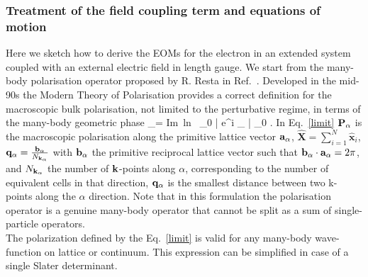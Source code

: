 \subsubsection{Treatment of the field coupling term and equations of motion}\label{ss:fldcpl}
Here we sketch how to derive the EOMs for the electron in an extended system coupled with an external electric field in length gauge. We start from the many-body polarisation operator proposed by R. Resta in Ref.~.
Developed in the mid-90s the Modern Theory of Polarisation\cite{RevModPhys.66.899} provides a correct definition for the macroscopic bulk polarisation, not limited to the perturbative regime, in terms of the many-body geometric phase 
\be 
\PP_\alpha =   \mbox{Im ln }  \langle \Psi_0 | {\rm e}^{i \qq_\alpha \cdot {}} | \Psi_0 \rangle . \label{limit} 
\ee
In Eq.~\eqref{limit} ${\bf P}_\alpha$ is the macroscopic polarisation along the primitive lattice vector ${\bf a}_\alpha$, $\hat{\mathbf X} = \sum_{i=1}^{N} \hat{\mathbf x}_i$, ${\bf q}_\alpha = \frac{{\bf b}_\alpha}{N_{{\bf k}_\alpha}}$ with ${\bf b}_\alpha$ the primitive reciprocal lattice vector such that ${\bf b}_\alpha\cdot{\bf a}_\alpha=2\pi$, and $N_{{\bf k}_\alpha}$ the number of ${\bf k}$-points along $\alpha$, corresponding to the number of equivalent cells in that direction, ${\bf q}_\alpha$ is the smallest distance between two k-points along the $\alpha$ direction.
Note that in this formulation the polarisation operator is a genuine many-body operator that cannot be split as a sum of single-particle operators. \\
The polarization defined by the Eq.~\ref{limit} is valid for any many-body wave-function on lattice or continuum\cite{PhysRevLett.80.1800,resta1999electron}. This expression can be simplified in case of a single Slater determinant.



